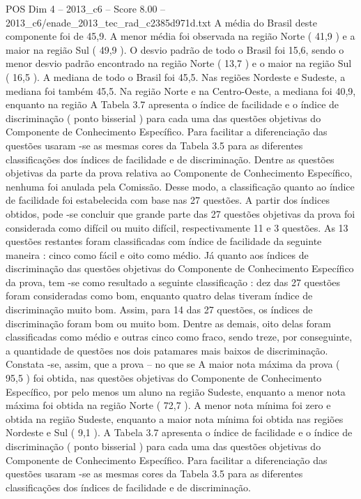 \begin{textsample}{POS Dim 4 – 2013\_c6 – Score 8.00 – 2013\_c6/enade\_2013\_tec\_rad\_c2385d971d.txt}
A média do Brasil deste componente foi de 45,9.
A menor média foi observada na região Norte ( 41,9 ) e a maior na região Sul ( 49,9 ).
O desvio padrão de todo o Brasil foi 15,6, sendo o menor desvio padrão encontrado na região Norte ( 13,7 ) e o maior na região Sul ( 16,5 ).
A mediana de todo o Brasil foi 45,5.
Nas regiões Nordeste e Sudeste, a mediana foi também 45,5.
Na região Norte e na Centro-Oeste, a mediana foi 40,9, enquanto na região A Tabela 3.7 apresenta o índice de facilidade e o índice de discriminação ( ponto bisserial ) para cada uma das questões objetivas do Componente de Conhecimento Específico.
Para facilitar a diferenciação das questões usaram -se as mesmas cores da Tabela 3.5 para as diferentes classificações dos índices de facilidade e de discriminação.
Dentre as questões objetivas da parte da prova relativa ao Componente de Conhecimento Específico, nenhuma foi anulada pela Comissão.
Desse modo, a classificação quanto ao índice de facilidade foi estabelecida com base nas 27 questões.
A partir dos índices obtidos, pode -se concluir que grande parte das 27 questões objetivas da prova foi considerada como difícil ou muito difícil, respectivamente 11 e 3 questões.
As 13 questões restantes foram classificadas com índice de facilidade da seguinte maneira : cinco como fácil e oito como médio.
Já quanto aos índices de discriminação das questões objetivas do Componente de Conhecimento Específico da prova, tem -se como resultado a seguinte classificação : dez das 27 questões foram consideradas como bom, enquanto quatro delas tiveram índice de discriminação muito bom.
Assim, para 14 das 27 questões, os índices de discriminação foram bom ou muito bom.
Dentre as demais, oito delas foram classificadas como médio e outras cinco como fraco, sendo treze, por conseguinte, a quantidade de questões nos dois patamares mais baixos de discriminação.
Constata -se, assim, que a prova – no que se A maior nota máxima da prova ( 95,5 ) foi obtida, nas questões objetivas do Componente de Conhecimento Específico, por pelo menos um aluno na região Sudeste, enquanto a menor nota máxima foi obtida na região Norte ( 72,7 ).
A menor nota mínima foi zero e obtida na região Sudeste, enquanto a maior nota mínima foi obtida nas regiões Nordeste e Sul ( 9,1 ).
A Tabela 3.7 apresenta o índice de facilidade e o índice de discriminação ( ponto bisserial ) para cada uma das questões objetivas do Componente de Conhecimento Específico.
Para facilitar a diferenciação das questões usaram -se as mesmas cores da Tabela 3.5 para as diferentes classificações dos índices de facilidade e de discriminação.

\end{textsample}
